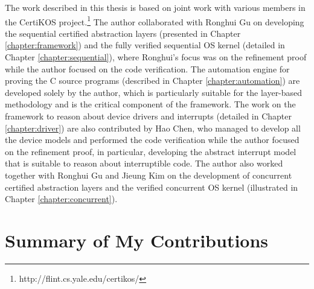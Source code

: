 The work described in this thesis is based on joint work with various members
in the CertiKOS project.\footnote{http://flint.cs.yale.edu/certikos/}
The author collaborated with Ronghui Gu on developing the sequential certified abstraction layers
(presented in Chapter \ref{chapter:framework}) and the fully verified
sequential OS kernel (detailed in Chapter \ref{chapter:sequential}), where Ronghui's focus was on the refinement proof
while the author focused on the code verification.
The automation
engine for proving the C source programs (described in Chapter \ref{chapter:automation})
are developed solely by the author, which is particularly suitable for the
layer-based methodology and is the critical component of the framework.
The work on the framework to reason about device drivers and interrupts
(detailed in Chapter \ref{chapter:driver}) are also contributed
by Hao Chen, who managed to develop all the device models and performed the code verification
while the author focused on the refinement proof, in particular, developing the abstract interrupt model
that is suitable to reason about interruptible code.
The author also worked together with Ronghui Gu and Jieung Kim on the development of
concurrent certified abstraction layers and the verified concurrent OS kernel
(illustrated in Chapter \ref{chapter:concurrent}).


\section{Summary of My Contributions}

